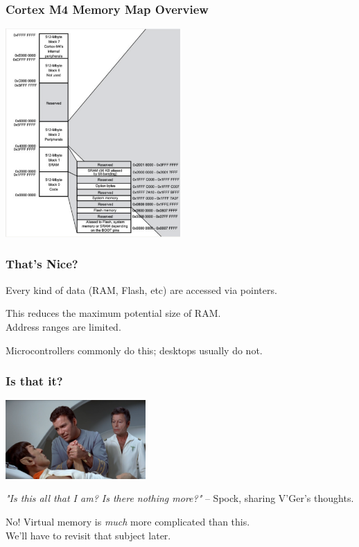 \begin{frame}
\frametitle{Cortex M4 Memory Map Overview}

\begin{center}
  \includegraphics[width=0.5\textwidth]{images/m4memmap.png}
\end{center}

\end{frame}

\begin{frame}
\frametitle{That's Nice?}

Every kind of data (RAM, Flash, etc) are accessed via pointers.

This reduces the maximum potential size of RAM.\\
\quad Address ranges are limited.

Microcontrollers commonly do this; desktops usually do not.

\end{frame}

\begin{frame}
\frametitle{Is that it?}

\begin{center}
  \includegraphics[width=0.4\textwidth]{images/allthatiam.png}
\end{center}\vspace{-2em}
  \textit{"Is this all that I am? Is there nothing more?"} -- Spock, sharing V'Ger's thoughts.

No! Virtual memory is \textit{much} more complicated than this.\\
\quad We'll have to revisit that subject later.

\end{frame}



